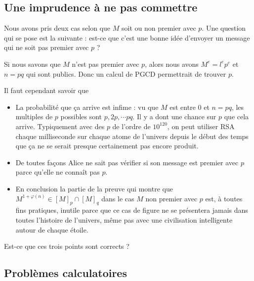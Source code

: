 \subsection{Une imprudence à ne pas commettre}

Nous avons pris deux cas selon que \( M\) soit ou non premier avec \( p\). Une question qui se pose est la suivante : est-ce que c'est une bonne idée d'envoyer un message qui ne soit pas premier avec \( p\) ?

Si nous savons que \( M\) n'est pas premier avec \( p\), alors nous avons \( M^e=l^ep^e\) et \( n=pq\) qui sont publics. Donc un calcul de PGCD permettrait de trouver \( p\).

Il faut cependant savoir que \label{PageAKTBooMDeQxY}
\begin{itemize}
    \item La probabilité que ça arrive est infime : vu que \( M\) est entre \( 0\) et \( n=pq\), les multiples de \( p\) possibles sont \( p,2p,\cdots pq\). Il y a dont une chance sur \( p\) que cela arrive. Typiquement avec des \( p\) de l'ordre de \( 10^{120}\), on peut utiliser RSA chaque milliseconde sur chaque atome de l'univers depuis le début des temps que ça ne se serait presque certainement pas encore produit.
    \item
        De toutes façons Alice ne sait pas vérifier si son message est premier avec \( p\) parce qu'elle ne connaît pas \( p\).
    \item
        En conclusion la partie de la preuve qui montre que \( M^{1+\varphi(n)}\in [M]_p\cap[M]_q\) dans le cas \( M\) non premier avec \( p\) est, à toutes fins pratiques, inutile parce que ce cas de figure ne se présentera jamais dans toutes l'histoire de l'univers, même pas avec une civilisation intelligente autour de chaque étoile.
\end{itemize}

\begin{probleme}\label{ProbGAYFooZATuYy}
    Est-ce que ces trois points sont corrects ?
\end{probleme}

\subsection{Problèmes calculatoires}

